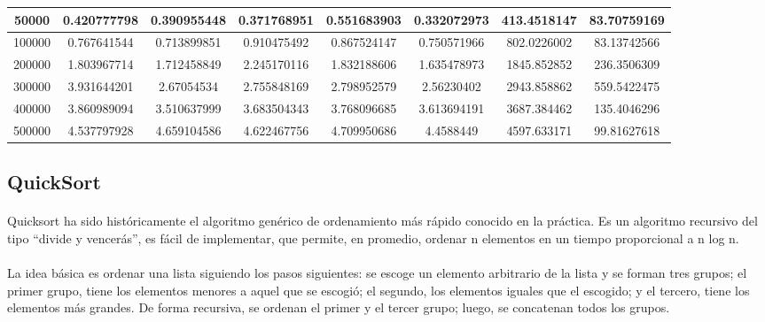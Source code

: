 \documentclass{article}
\begin{document}
\begin{table}[]
\begin{tabular}{|c|c|c|c|c|c|c|c| }
50000 &	0.420777798 &	0.390955448 &	0.371768951 &	0.551683903 &	0.332072973	 &413.4518147	 &83.70759169\\ \hline
100000 &	0.767641544	 &0.713899851 &	0.910475492 &	0.867524147 &	0.750571966 &	802.0226002	 &83.13742566\\ \hline
200000 &	1.803967714 &	1.712458849 &	2.245170116 &	1.832188606 &	1.635478973	 &1845.852852 &	236.3506309\\ \hline
300000 &	3.931644201 &	2.67054534 &	2.755848169 &	2.798952579 &	2.56230402	 &2943.858862	 &559.5422475\\ \hline
400000 &	3.860989094 &	3.510637999 &	3.683504343 &	3.768096685 &	3.613694191	 &3687.384462	 &135.4046296\\ \hline
500000 &	4.537797928 &	4.659104586 &	4.622467756 &	4.709950686 &	4.4588449	 &4597.633171 &99.81627618\\ \hline
            
            
            \end{tabular}
    \end{table} 
    \subsection{QuickSort}
        \paragraph {}
        Quicksort ha sido históricamente el algoritmo genérico de ordenamiento más rápido conocido en la práctica. Es un algoritmo recursivo del tipo “divide y vencerás”, es fácil de implementar, que permite, en promedio, ordenar n elementos en un tiempo proporcional a n log n.
        \paragraph {}
        La idea básica es ordenar una lista siguiendo los pasos siguientes: se escoge un elemento arbitrario de la lista y se forman tres grupos; el primer grupo, tiene los elementos menores a aquel que se escogió; el segundo, los elementos iguales que el escogido; y el tercero, tiene los elementos más grandes. De forma recursiva, se ordenan el primer y el tercer grupo; luego, se concatenan todos los grupos.
\end{document}
